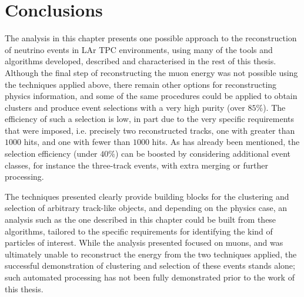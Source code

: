 \section{Conclusions}
The analysis in this chapter presents one possible approach to the reconstruction of neutrino events in \ac{LAr TPC} environments, using many of the tools and algorithms developed, described and characterised in the rest of this thesis. Although the final step of reconstructing the muon energy was not possible using the techniques applied above, there remain other options for reconstructing physics information, and some of the same procedures could be applied to obtain clusters and produce event selections with a very high purity (over $85\%$). The efficiency of such a selection is low, in part due to the very specific requirements that were imposed, i.e. precisely two reconstructed tracks, one with greater than $1000$ hits, and one with fewer than $1000$ hits. As has already been mentioned, the selection efficiency (under $40\%$) can be boosted by considering additional event classes, for instance the three-track events, with extra merging or further processing.

The techniques presented clearly provide building blocks for the clustering and selection of arbitrary track-like objects, and depending on the physics case, an analysis such as the one described in this chapter could be built from these algorithms, tailored to the specific requirements for identifying the kind of particles of interest. While the analysis presented focused on muons, and was ultimately unable to reconstruct the energy from the two techniques applied, the successful demonstration of clustering and selection of these events stands alone; such automated processing has not been fully demonstrated prior to the work of this thesis.
